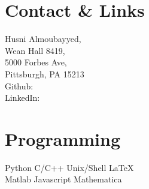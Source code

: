 \documentclass[]{deedy-resume-openfont}
\begin{document}
%
%

%
%


%
%

\begin{minipage}[t]{0.33\textwidth} 



$\; 
\;
\;$


\section{\color{Blue} Contact \& Links} 
Husni Almoubayyed,\\ 
Wean Hall 8419, \\ 5000 Forbes Ave, \\ Pittsburgh, PA 15213 \\
Github: \href{https://github.com/hsnee}{} \\
LinkedIn:  \href{https://www.linkedin.com/in/husnialmoubayyed}{} 
\sectionsep




\section{\color{Blue} Programming}
\textbullet{} Python \textbullet{}  C/C++ \textbullet{} Unix/Shell \textbullet{} \LaTeX  \\
\textbullet{} Matlab \textbullet{} Javascript \textbullet{} Mathematica \\
\sectionsep




\end{minipage}
\end{document}
